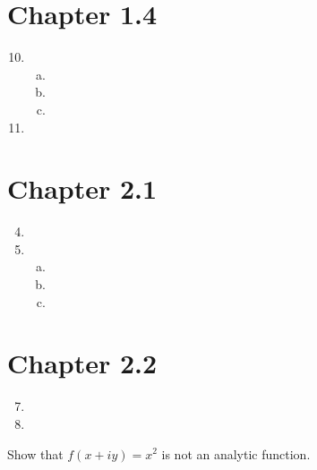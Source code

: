 \documentclass{article}
\newcommand{\Chapter}[1]{\section*{Chapter #1}}
\begin{document}
\Chapter{1.4}
\begin{enumerate}[1.]
\setcounter{enumi}{9}
\item \begin{enumerate}[a.]
      \item
      \item
      \item
      \end{enumerate}

\item

\end{enumerate}

\Chapter{2.1}
\begin{enumerate}[1.]
\setcounter{enumi}{3}
\item

\item \begin{enumerate}[a.]
      \item
      \item
      \item
      \end{enumerate}

\end{enumerate}

\Chapter{2.2}
\begin{enumerate}[1.]
\setcounter{enumi}{6}
\item

\setcounter{enumi}{9}
\item
\end{enumerate}
Show that $f(x+iy) = x^2$ is not an analytic function.
\end{document}

